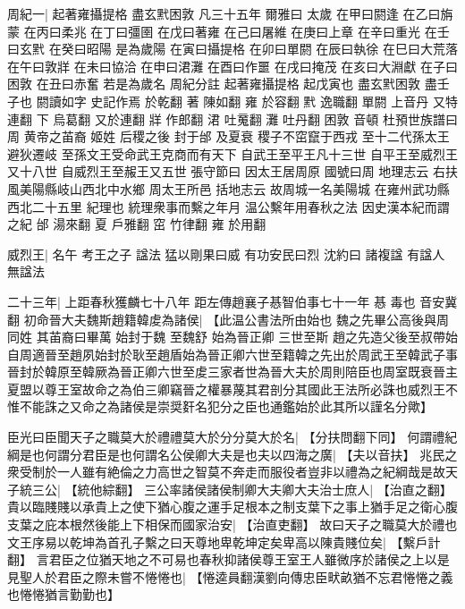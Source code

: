 % 

周紀一|{
	起著雍攝提格 盡玄黓困敦 凡三十五年
	爾雅曰
	太歲
	在甲曰閼逢
	在乙曰旃蒙
	在丙曰柔兆
	在丁曰彊圉
	在戊曰著雍
	在己曰屠維
	在庚曰上章
	在辛曰重光
	在壬曰玄黓
	在癸曰昭陽
	是為歲陽
	在寅曰攝提格
	在卯曰單閼
	在辰曰執徐
	在巳曰大荒落
	在午曰敦牂
	在未曰協洽
	在申曰涒灘
	在酉曰作噩
	在戌曰掩茂
	在亥曰大淵獻
	在子曰困敦
	在丑曰赤奮
	若是為歲名
	周紀分註 起著雍攝提格 起戊寅也
	盡玄黓困敦 盡壬子也
	閼讀如字 史記作焉 於乾翻
	著 陳如翻
	雍 於容翻
	黓 逸職翻
	單閼 上音丹 又特連翻
	下 烏葛翻 又於連翻
	牂 作郎翻
	涒 吐䰟翻
	灘 吐丹翻
	困敦 音頓
	杜預世族譜曰 周 黄帝之苖裔 姬姓
	后稷之後 封于邰 及夏衰 稷子不窋竄于西戎
	至十二代孫太王 避狄遷岐
	至孫文王受命武王克商而有天下
	自武王至平王凡十三世
	自平王至威烈王又十八世
	自威烈王至赧王又五世
	張守節曰 因太王居周原 國號曰周
	地理志云 右扶風美陽縣岐山西北中水鄉 周太王所邑
	括地志云 故周城一名美陽城 在雍州武功縣西北二十五里 紀理也 統理衆事而繫之年月
	温公繫年用春秋之法 因史漢本紀而謂之紀
	邰 湯來翻
	夏 戶雅翻
	窋 竹律翻
	雍 於用翻}
\par
威烈王|{
	名午 考王之子
	諡法 猛以剛果曰威 有功安民曰烈
	沈約曰 諸複諡 有諡人 無諡法}
\par
二十三年|{
	上距春秋獲麟七十八年 距左傳趙襄子惎智伯事七十一年
	惎 毒也 音安冀翻}
初命晉大夫魏斯趙籍韓䖍為諸侯|{
	【此温公書法所由始也
	魏之先畢公高後與周同姓 其苖裔曰畢萬 始封于魏
	至魏舒 始為晉正卿 三世至斯
	趙之先造父後至叔帶始自周適晉至趙夙始封於耿至趙盾始為晉正卿六世至籍韓之先出於周武王至韓武子事晉封於韓原至韓厥為晉正卿六世至䖍三家者世為晉大夫於周則陪臣也周室既衰晉主夏盟以尊王室故命之為伯三卿竊晉之權暴蔑其君剖分其國此王法所必誅也威烈王不惟不能誅之又命之為諸侯是崇奨姧名犯分之臣也通鑑始於此其所以謹名分歟】}
\par
臣光曰臣聞天子之職莫大於禮禮莫大於分分莫大於名|{
	【分扶問翻下同】}
何謂禮紀綱是也何謂分君臣是也何謂名公侯卿大夫是也夫以四海之廣|{
	【夫以音扶】}
兆民之衆受制於一人雖有絶倫之力高世之智莫不奔走而服役者豈非以禮為之紀綱哉是故天子統三公|{
	【統他綜翻】}
三公率諸侯諸侯制卿大夫卿大夫治士庶人|{
	【治直之翻】}
貴以臨賤賤以承貴上之使下猶心腹之運手足根本之制支葉下之事上猶手足之衛心腹支葉之庇本根然後能上下相保而國家治安|{
	【治直吏翻】}
故曰天子之職莫大於禮也文王序易以乾坤為首孔子繫之曰天尊地卑乾坤定矣卑高以陳貴賤位矣|{
	【繫戶計翻】}
言君臣之位猶天地之不可易也春秋抑諸侯尊王室王人雖微序於諸侯之上以是見聖人於君臣之際未嘗不惓惓也|{
	【惓逵員翻漢劉向傳忠臣畎畝猶不忘君惓惓之義也惓惓猶言勤勤也】}
